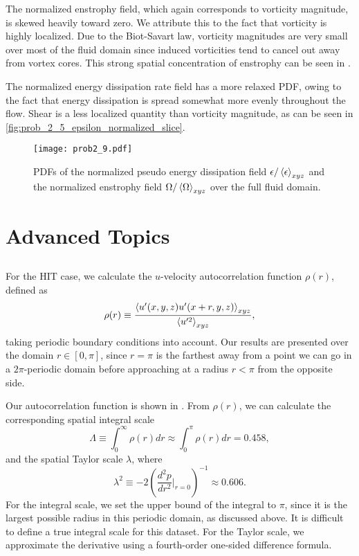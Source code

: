 \documentclass[11pt]{article}
\begin{document}
The normalized enstrophy field, which again corresponds to vorticity magnitude, is skewed heavily toward zero. We attribute this to the fact that vorticity is highly localized. Due to the Biot-Savart law, vorticity magnitudes are very small over most of the fluid domain since induced vorticities tend to cancel out away from vortex cores. This strong spatial concentration of enstrophy can be seen in .

The normalized energy dissipation rate field has a more relaxed PDF, owing to the fact that energy dissipation is spread somewhat more evenly throughout the flow. Shear is a less localized quantity than vorticity magnitude, as can be seen in \ref{fig:prob_2_5_epsilon_normalized_slice}.

\begin{figure}[t]
\centering
\texttt{[image: prob2\_9.pdf]}
\\[6pt]
\caption{PDFs of the normalized pseudo energy dissipation field $\epsilon / \left< \epsilon \right>_{xyz}$ and the normalized enstrophy field $\Omega / \left< \Omega \right>_{xyz}$ over the full fluid domain.}
\label{fig:prob_2_9_energy_and_enstrophy_PDFs}
\end{figure}

\section{Advanced Topics}

\subsection{}

For the HIT case, we calculate the $u$-velocity autocorrelation function $\rho(r)$, defined as
\begin{equation}
\rho(r) \equiv
\frac{\left< u'(x,y,z) u'(x+r,y,z) \right>_{xyz}}{\left< u'^2 \right>_{xyz}}
,
\end{equation}
taking periodic boundary conditions into account. Our results are presented over the domain $r \in [0,\pi]$, since $r=\pi$ is the farthest away from a point we can go in a $2\pi$-periodic domain before approaching at a radius $r < \pi$ from the opposite side.

Our autocorrelation function is shown in . From $\rho(r)$, we can calculate the corresponding spatial integral scale
\begin{equation}
\Lambda \equiv \int_0^\infty \rho(r) dr
\approx
\int_0^\pi \rho(r) dr
=
0.458
,
\end{equation}
and the spatial Taylor scale $\lambda$, where
\begin{equation}
\lambda^2 \equiv -2 \left( \frac{d^2 p}{d r^2} \Big|_{r=0} \right)^{-1}
\approx
0.606
.
\end{equation}
For the integral scale, we set the upper bound of the integral to $\pi$, since it is the largest possible radius in this periodic domain, as discussed above. It is difficult to define a true integral scale for this dataset. For the Taylor scale, we approximate the derivative using a fourth-order one-sided difference formula.
\end{document}
